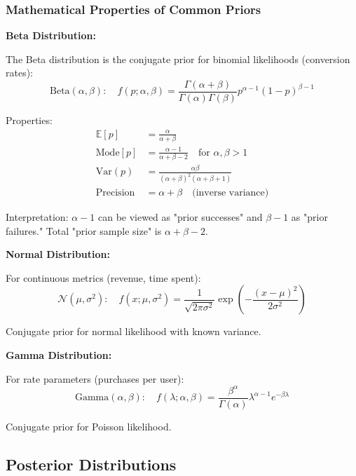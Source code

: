 \subsubsection{Mathematical Properties of Common Priors}

\textbf{Beta Distribution:}

The Beta distribution is the conjugate prior for binomial likelihoods (conversion rates):
\begin{equation}
\text{Beta}(\alpha, \beta): \quad f(p; \alpha, \beta) = \frac{\Gamma(\alpha + \beta)}{\Gamma(\alpha)\Gamma(\beta)} p^{\alpha-1}(1-p)^{\beta-1}
\end{equation}

Properties:
\begin{align}
\mathbb{E}[p] &= \frac{\alpha}{\alpha + \beta} \\
\text{Mode}[p] &= \frac{\alpha - 1}{\alpha + \beta - 2} \quad \text{for } \alpha, \beta > 1 \\
\text{Var}(p) &= \frac{\alpha\beta}{(\alpha+\beta)^2(\alpha+\beta+1)} \\
\text{Precision} &= \alpha + \beta \quad \text{(inverse variance)}
\end{align}

Interpretation: $\alpha - 1$ can be viewed as "prior successes" and $\beta - 1$ as "prior failures." Total "prior sample size" is $\alpha + \beta - 2$.

\textbf{Normal Distribution:}

For continuous metrics (revenue, time spent):
\begin{equation}
\mathcal{N}(\mu, \sigma^2): \quad f(x; \mu, \sigma^2) = \frac{1}{\sqrt{2\pi\sigma^2}} \exp\left(-\frac{(x-\mu)^2}{2\sigma^2}\right)
\end{equation}

Conjugate prior for normal likelihood with known variance.

\textbf{Gamma Distribution:}

For rate parameters (purchases per user):
\begin{equation}
\text{Gamma}(\alpha, \beta): \quad f(\lambda; \alpha, \beta) = \frac{\beta^\alpha}{\Gamma(\alpha)} \lambda^{\alpha-1} e^{-\beta\lambda}
\end{equation}

Conjugate prior for Poisson likelihood.

\subsection{Posterior Distributions}

